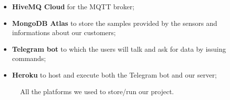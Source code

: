 \begin{itemize}
\begin{itemize}
        \item \textbf{HiveMQ Cloud} for the MQTT broker;
        \item \textbf{MongoDB Atlas} to store the samples provided by the sensors and informations about our customers;
        \item \textbf{Telegram bot} to which the users will talk and ask for data by issuing commands;
        \item \textbf{Heroku} to host and execute both the Telegram bot and our server;
    \end{itemize}
    \begin{figure}[H]%
        \centering
        \hspace{8mm}
        \hspace{8mm}
        \hspace{8mm}
        \caption{All the platforms we used to store/run our project.}
        \label{fig:software}%
    \end{figure}
\end{itemize}

